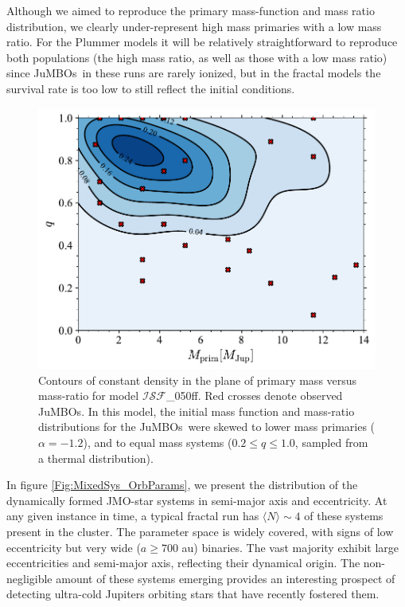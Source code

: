 \documentclass[submission,phys]{lib/SciPost}
\newcommand{\jumbos}{\mbox{JuMBOs}}
\begin{document}
Although we aimed to reproduce the primary mass-function and mass
ratio distribution, we clearly under-represent high mass primaries
with a low mass ratio. For the Plummer models it will be relatively
straightforward to reproduce both populations (the high mass ratio, as
well as those with a low mass ratio) since \jumbos\, in these runs are
rarely ionized, but in the fractal models the survival rate is too low
to still reflect the initial conditions.

   \begin{figure}
    \centering
    \includegraphics[width=0.75\columnwidth]{figures/Fractal_rvir0.5_Obs_mass_distr.pdf}
    \caption{Contours of constant density in the plane of primary mass
      versus mass-ratio for model $\mathcal{ISF}$\_050ff. Red crosses
      denote observed \jumbos.  In this model, the initial mass
      function and mass-ratio distributions for the \jumbos\, were
      skewed to lower mass primaries ($\alpha = -1.2$), and to equal
      mass systems ($0.2\leq q\leq 1.0$, sampled from a thermal
      distribution).  }
         \label{Fig:FractalObs_mdistr}
   \end{figure}

In figure \ref{Fig:MixedSys_OrbParams}, we present the distribution of
the dynamically formed JMO-star systems in semi-major axis and eccentricity.
At any given instance in time, a typical fractal run has $\langle N\rangle \sim 
4$ of these systems present in the cluster. The parameter space
is widely covered, with signs of low eccentricity but very wide
($a\geq700$ au) binaries. The vast majority exhibit
large eccentricities and semi-major axis, reflecting their dynamical
origin. The non-negligible amount of these systems emerging provides an
interesting prospect of detecting ultra-cold Jupiters orbiting stars
that have recently fostered them.
\end{document}

